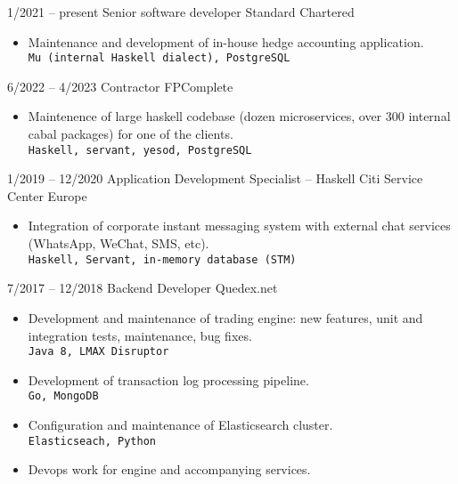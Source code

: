\documentclass[8pt]{developercv} %
\begin{document}
\begin{entrylist}
	\entry
		{1/2021 -- present}
		{Senior software developer}
		{Standard Chartered}
		{\begin{itemize}
                  \item Maintenance and development of in-house hedge accounting
                    application.\\
                    \texttt{Mu (internal Haskell dialect), PostgreSQL}
                  \end{itemize}
                }
	\entry
		{6/2022 -- 4/2023}
		{Contractor}
		{FPComplete}
		{\begin{itemize}
                  \item Maintenence of large haskell codebase (dozen microservices, over 300 internal cabal packages) for one of the clients.\\
                    \texttt{Haskell, servant, yesod, PostgreSQL}
                  \end{itemize}
                }                
	\entry
		{1/2019 -- 12/2020}
		{Application Development Specialist -- Haskell}
		{Citi Service Center Europe}
		{\begin{itemize}
                  \item Integration of corporate instant messaging system
                    with external chat services (WhatsApp, WeChat, SMS, etc).\\
                    \texttt{Haskell, Servant, in-memory database (STM)}
                  \end{itemize}
                }
	\entry
		{7/2017 -- 12/2018}
		{Backend Developer}
		{Quedex.net}
		{\begin{itemize}
                  \item Development and maintenance of trading engine:
                    new features, unit and integration tests, maintenance,
                    bug fixes.\\
                    \texttt{Java 8, LMAX Disruptor}
                  \item Development of transaction log processing pipeline.\\
                    \texttt{Go, MongoDB}
                  \item Configuration and maintenance of Elasticsearch cluster.\\
                    \texttt{Elasticseach, Python}
                  \item Devops work for engine and accompanying services.\\

\end{itemize}}
\end{entrylist}
\end{document}
